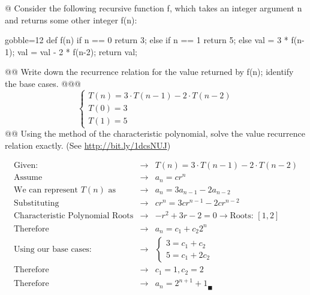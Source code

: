 \documentclass[10pt]{article}
\begin{document}
\begin{easylist}[enumerate]
    @ Consider the following recursive function {\ttfamily f}, which takes an integer argument {\ttfamily n} and returns some other integer {\ttfamily f(n)}:

        \begin{pythoncode*}{gobble=12}
            def f(n)
                if n == 0
                    return 3;
                else if n == 1
                    return 5;
                else
                    val = 3 * f(n-1);
                    val = val - 2 * f(n-2);
                    return val;
        \end{pythoncode*}

    @@ Write down the recurrence relation for the value returned by {\ttfamily f(n)}; identify the base cases.
    @@@
        \[ \begin{cases}
                T(n) = 3 \cdot T(n - 1) - 2 \cdot T(n - 2)\\
                T(0) = 3\\
                T(1) = 5
            \end{cases} \]
    @@ Using the method of the characteristic polynomial, solve the value recurrence relation exactly. (See \url{http://bit.ly/1dcsNUJ})

    \[
        \begin{aligned}
            \text{Given: }                         & \to & T(n) = 3 \cdot T(n - 1) - 2 \cdot T(n - 2)\\
            \text{Assume }                         & \to & a_n = c r^n\\
            \text{We can represent $T(n)$ as }     & \to & a_n = 3 a_{n-1} - 2 a_{n-2}\\
            \text{Substituting }                   & \to & c r^n = 3cr^{n-1} - 2 c r^{n-2}\\
            \text{Characteristic Polynomial Roots} & \to & -r^2 + 3r -2 = 0 \to \text{Roots: } [1, 2]\\
            \text{Therefore}                       & \to & a_n = c_1 + c_2 2^n\\
            \text{Using our base cases: }          & \to & \begin{cases} 3 = c_1 + c_2\\5 = c_1 + 2 c_2 \end{cases}\\
            \text{Therefore}                       & \to & c_1 = 1, c_2 = 2\\
            \text{Therefore}                       & \to & \boxed{a_n = 2^{n+1} + 1}_\blacksquare
        \end{aligned}
    \]


\end{easylist}
\end{document}
